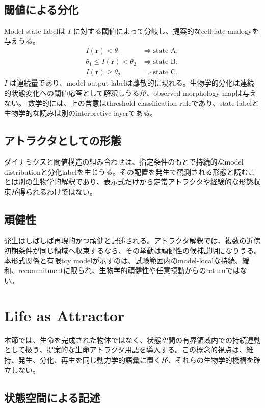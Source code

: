 \documentclass[11pt]{ltjsarticle}
\newcommand{\I}{I}
\begin{document}
\subsection{閾値による分化}

Model-state labelは \(\I\) に対する閾値によって分岐し、提案的なcell-fate analogyを与えうる。
\begin{align}
  \I(\mathbf{r})<\theta_1 &\Rightarrow \text{state A},\\
  \theta_1\leq\I(\mathbf{r})<\theta_2 &\Rightarrow \text{state B},\\
  \I(\mathbf{r})\geq\theta_2 &\Rightarrow \text{state C}.
\end{align}
\(\I\) は連続量であり、model output labelは離散的に現れる。生物学的分化は連続的状態変化への閾値応答として解釈しうるが、observed morphology mapは与えない。
数学的には、上の含意はthreshold classification ruleであり、state labelと生物学的な読みは別のinterpretive layerである。

\subsection{アトラクタとしての形態}

ダイナミクスと閾値構造の組み合わせは、指定条件のもとで持続的なmodel distributionと分化labelを生じうる。その配置を発生で観測される形態と読むことは別の生物学的解釈であり、表示式だけから定常アトラクタや経験的な形態収束が得られるわけではない。

\subsection{頑健性}

発生はしばしば再現的かつ頑健と記述される。アトラクタ解釈では、複数の近傍初期条件が同じ領域へ収束するなら、その挙動は頑健性の候補説明になりうる。本形式関係と有限toy modelが示すのは、試験範囲内のmodel-localな持続、緩和、recommitmentに限られ、生物学的頑健性や任意摂動からのreturnではない。

\section{Life as Attractor}

本節では、生命を完成された物体ではなく、状態空間の有界領域内での持続運動として扱う、提案的な生命アトラクタ用語を導入する。この概念的視点は、維持、発生、分化、再生を同じ動力学的語彙に置くが、それらの生物学的機構を確立しない。

\subsection{状態空間による記述}
\end{document}

